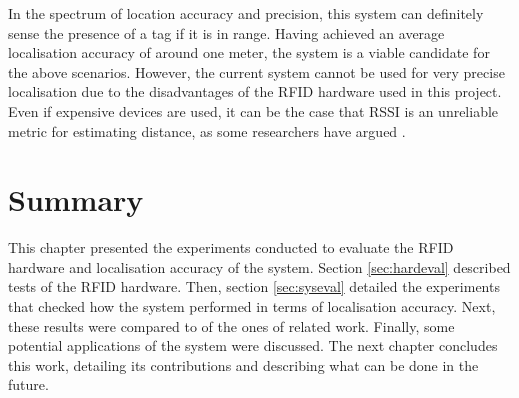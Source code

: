 In the spectrum of location accuracy and precision, this system can definitely sense the presence of a tag if it is in range. Having achieved an average localisation accuracy of around one meter, the system is a viable candidate for the above scenarios. However, the current system cannot be used for very precise localisation due to the disadvantages of the RFID hardware used in this project. Even if expensive devices are used, it can be the case that RSSI is an unreliable metric for estimating distance, as some researchers have argued \cite{Elnahrawy2004, Parameswaran2009}.


\section{Summary}

This chapter presented the experiments conducted to evaluate the RFID hardware and localisation accuracy of the system. Section \ref{sec:hardeval} described tests of the RFID hardware. Then, section \ref{sec:syseval} detailed the experiments that checked how the system performed in terms of localisation accuracy. Next, these results were compared to of the ones of related work. Finally, some potential applications of the system were discussed. The next chapter concludes this work, detailing its contributions and describing what can be done in the future.
